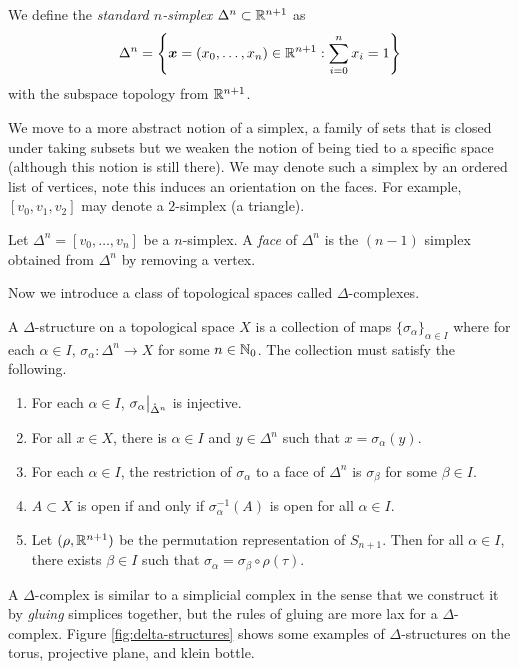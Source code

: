 \begin{definition}
  We define the \emph{standard $n$-simplex} $\Delta^{n} \subset \mathbb{R}^{n+1}$ as
  \[ \Delta^n = \left\{\bm x = (x_0, \ldots, x_n) \in \mathbb{R}^{n+1}: \sum_{i = 0}^{n} x_i = 1\right\} \]
  with the subspace topology from $\mathbb{R}^{n+1}$.
\end{definition}

We move to a more abstract notion of a simplex, a family of sets that is closed under taking subsets but we weaken the notion of being tied to a specific space (although this notion is still there). We may denote such a simplex by an ordered list of vertices, note this induces an orientation on the faces. For example, $[v_0, v_1, v_2]$ may denote a $2$-simplex (a triangle).

\begin{definition}
  Let $\Delta^n = [v_0, \ldots, v_n]$ be a $n$-simplex. A \emph{face} of $\Delta^n$ is the $(n-1)$ simplex obtained from $\Delta^n$ by removing a vertex.
\end{definition}

Now we introduce a class of topological spaces called $\Delta$-complexes.

\begin{definition}
  A $\Delta$-structure on a topological space $X$ is a collection of maps $\{\sigma_\alpha\}_{\alpha \in I}$ where for each $\alpha \in I$, $\sigma_\alpha: \Delta^n \to X$ for some $n \in \mathbb{N}_0$. The collection must satisfy the following.
  \begin{enumerate}
    \item For each $\alpha \in I$, $\restr{\sigma_\alpha}{\mathring \Delta^n}$ is injective.
    \item For all $x \in X$, there is $\alpha \in I$ and $y \in \Delta^n$ such that $x = \sigma_\alpha(y)$.
    \item For each $\alpha \in I$, the restriction of $\sigma_\alpha$ to a face of $\Delta^n$ is $\sigma_\beta$ for some $\beta \in I$.
    \item $A \subset X$ is open if and only if $\sigma_\alpha^{-1}(A)$ is open for all $\alpha \in I$.
    \item Let $(\rho, \mathbb{R}^{n+1})$ be the permutation representation of $S_{n+1}$. Then for all $\alpha \in I$, there exists $\beta \in I$ such that $\sigma_\alpha = \sigma_\beta \circ \rho(\tau)$.
  \end{enumerate}
\end{definition}

A $\Delta$-complex is similar to a simplicial complex in the sense that we construct it by \emph{gluing} simplices together, but the rules of gluing are more lax for a $\Delta$-complex. Figure \ref{fig:delta-structures} shows some examples of $\Delta$-structures on the torus, projective plane, and klein bottle.

